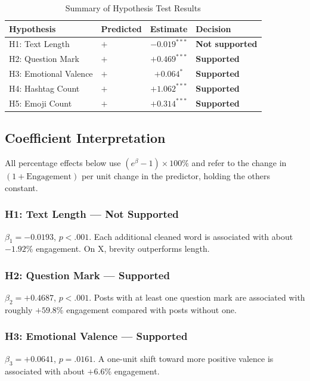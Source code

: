 \documentclass[12pt,a4paper]{article}
\begin{document}
\begin{table}[H]
\centering
\caption{Summary of Hypothesis Test Results}
\small
\begin{tabular}{llcl}
\toprule
Hypothesis & Predicted & Estimate & Decision \\
\midrule
H1: Text Length & $+$ & $-0.019^{***}$ & \textbf{Not supported} \\
H2: Question Mark & $+$ & $+0.469^{***}$ & \textbf{Supported} \\
H3: Emotional Valence & $+$ & $+0.064^{*}$ & \textbf{Supported} \\
H4: Hashtag Count & $+$ & $+1.062^{***}$ & \textbf{Supported} \\
H5: Emoji Count & $+$ & $+0.314^{***}$ & \textbf{Supported} \\
\bottomrule
\end{tabular}
\end{table}

\subsection{Coefficient Interpretation}

All percentage effects below use $(e^{\beta}-1)\times 100\%$ and refer to the change in $(1+\text{Engagement})$ per unit change in the predictor, holding the others constant.

\subsubsection*{H1: Text Length --- Not Supported}
$\beta_1 = -0.0193$, $p<.001$. Each additional cleaned word is associated with about $-1.92\%$ engagement. On X, brevity outperforms length.

\subsubsection*{H2: Question Mark --- Supported}
$\beta_2 = +0.4687$, $p<.001$. Posts with at least one question mark are associated with roughly $+59.8\%$ engagement compared with posts without one.

\subsubsection*{H3: Emotional Valence --- Supported}
$\beta_3 = +0.0641$, $p=.0161$. A one-unit shift toward more positive valence is associated with about $+6.6\%$ engagement.
\end{document}
